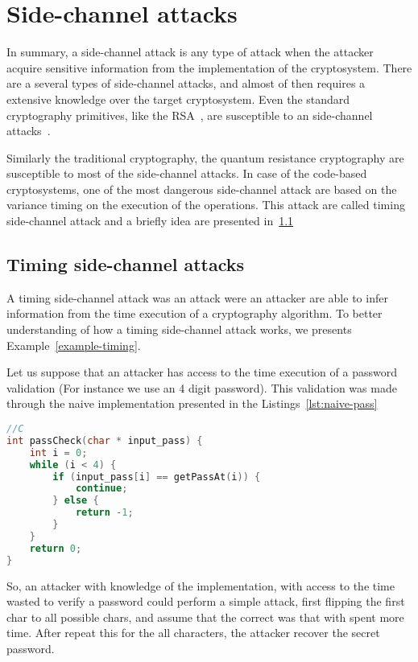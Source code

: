 \section{Side-channel attacks}
In summary, a side-channel attack is any type of attack when the attacker acquire sensitive information from the implementation of the cryptosystem. There are a several types of side-channel attacks, and almost of then requires a extensive knowledge over the target cryptosystem. Even the standard cryptography primitives, like the RSA~\cite{rivest1978method}, are susceptible to an side-channel attacks~\cite{kocher1996timing}. 

Similarly the traditional cryptography, the quantum resistance cryptography are susceptible to most of the side-channel attacks. In case of the code-based cryptosystems, one of the most dangerous side-channel attack are based on the variance timing on the execution of the operations. This attack are called timing side-channel attack and a briefly idea are presented in~\ref{sub:timing-attack}

\subsection{Timing side-channel attacks}\label{sub:timing-attack}
A timing side-channel attack was an attack were an attacker are able to infer information from the time execution of a cryptography algorithm. To better understanding of how a timing side-channel attack works, we presents Example~\ref{example-timing}. 

\begin{example}\label{example-timing}
Let us suppose that an attacker has access to the time execution of a password validation (For instance we use an 4 digit password). This validation was made through the naive implementation presented in the Listings~\ref{lst:naive-pass}

\begin{lstlisting}[caption={Naive implementation of password check },label={lst:naive-pass},language=C]
//C
int passCheck(char * input_pass) {
    int i = 0;
    while (i < 4) {
        if (input_pass[i] == getPassAt(i)) {
            continue;
        } else {
            return -1;
        }
    }
    return 0;
}
\end{lstlisting}
So, an attacker with knowledge of the implementation, with access to the time wasted to verify a password could perform a simple attack, first  flipping the first char to all possible chars, and assume that the correct was that with spent more time. After repeat this for the all characters, the attacker recover the secret password.
\end{example}

